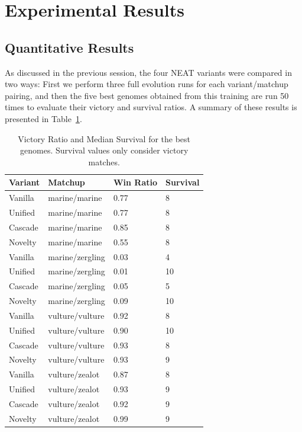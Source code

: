 \section{Experimental Results}\label{section:experiments-results}

\subsection{Quantitative Results}

As discussed in the previous session, the four NEAT variants were
compared in two ways: First we perform three full evolution runs for
each variant/matchup pairing, and then the five best genomes obtained
from this training are run 50 times to evaluate their victory and
survival ratios. A summary of these results is presented in
Table~\ref{table:quantitative}.

\begin{table}
  \caption{Victory Ratio and Median Survival for the best
    genomes. Survival values only consider victory matches.}
  \label{table:quantitative}
  \begin{tabular}{llll}
    \hline
    Variant & Matchup & Win Ratio & Survival\\
    \hline
    Vanilla & marine/marine & 0.77 & 8 \\ 
    Unified & marine/marine & 0.77 & 8 \\ 
    Cascade & marine/marine & 0.85 & 8 \\ 
    Novelty & marine/marine & 0.55 & 8 \\ 
    Vanilla & marine/zergling & 0.03 & 4 \\ 
    Unified & marine/zergling & 0.01 & 10 \\ 
    Cascade & marine/zergling & 0.05 & 5 \\ 
    Novelty & marine/zergling & 0.09 & 10 \\ 
    Vanilla & vulture/vulture & 0.92 & 8 \\ 
    Unified & vulture/vulture & 0.90 & 10 \\ 
    Cascade & vulture/vulture & 0.93 & 8 \\ 
    Novelty & vulture/vulture & 0.93 & 9 \\ 
    Vanilla & vulture/zealot & 0.87 & 8 \\ 
    Unified & vulture/zealot & 0.93 & 9 \\ 
    Cascade & vulture/zealot & 0.92 & 9 \\ 
    Novelty & vulture/zealot & 0.99 & 9 \\ 
    \hline
  \end{tabular}
\end{table}

